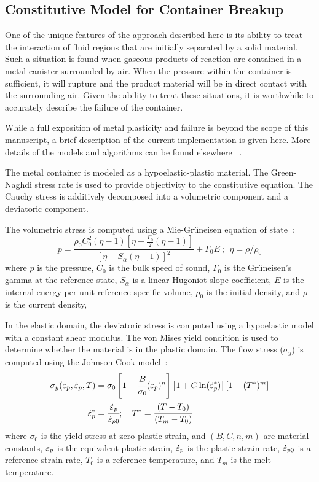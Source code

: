 \subsection{Constitutive Model for Container Breakup}\label{sec:cons_mod}

  One of the unique features of the approach described here is its ability to 
  treat the interaction of fluid regions that are initially separated by a 
  solid material.  Such a situation is found when gaseous products of 
  reaction are contained in a metal canister surrounded by air.  When the 
  pressure within the container is sufficient, it will rupture and the 
  product material will be in direct contact with the surrounding air.  Given 
  the ability to treat these situations, it is worthwhile to accurately 
  describe the failure of the container.

  While a full exposition of metal  
  plasticity and failure is beyond the scope of this manuscript, a brief 
  description of the current implementation is given here.  More details of
  the models and algorithms can be found elsewhere 
  ~\cite{Banerjee2005,Banerjee2005b,Banerjee2005d}.

  The metal container is modeled as a
  hypoelastic-plastic material.  The Green-Naghdi stress rate is used to 
  provide objectivity to the constitutive equation.  The Cauchy stress is 
  additively decomposed into a volumetric component and a deviatoric 
  component.  

  The volumetric stress is computed using a Mie-Gr{\"u}neisen equation of 
  state~\cite{Zocher2000}:
  \begin{equation} \label{eq:EOSMG}
   p = \frac{\rho_0 C_0^2 (\eta -1)
              \left[\eta - \frac{\Gamma_0}{2}(\eta-1)\right]}
             {\left[\eta - S_{\alpha}(\eta-1)\right]^2} + \Gamma_0 E~;~~
   \eta = \rho/\rho_0
  \end{equation}
  where $p$ is the pressure, $C_0$ is the bulk speed of sound,
  $\Gamma_0$ is the Gr{\"u}neisen's gamma at the reference state,
  $S_{\alpha}$ is a linear Hugoniot slope coefficient,
  $E$ is the internal energy per unit reference specific volume,
  $\rho_0$ is the initial density, and $\rho$ is the current density, 

 In the elastic domain, the deviatoric stress is computed using 
  a hypoelastic model with a constant shear modulus.  The von Mises yield 
  condition is used to determine whether the material is in the plastic 
  domain.  The flow stress ($\sigma_y$) is computed using the Johnson-Cook
  model~\cite{Johnson1983}: 
  \begin{align}
    \sigma_y(\varepsilon_p,\dot{\varepsilon}_{p},T) & =
    \sigma_0\left[1 + \cfrac{B}{\sigma_0} (\varepsilon_p)^n\right]
            \left[1 + C \ln(\dot{\varepsilon}_{p}^{*})\right]
            \left[1 - (T^*)^m\right] \\
    \dot{\varepsilon}_{p}^{*} & = \cfrac{\dot{\varepsilon}_{p}}{\dot{\varepsilon}_{p0}}; \quad
    T^* = \cfrac{(T-T_0)}{(T_m-T_0)}
  \end{align}
  where $\sigma_0$ is the yield stress at zero plastic strain, and
  $(B, C, n, m)$ are material constants, $\varepsilon_p$ is the equivalent plastic strain,
  $\dot{\varepsilon}_{p}$ is the plastic strain rate, $\dot{\varepsilon}_{p0}$ is a reference strain
  rate, $T_0$ is a reference temperature, and $T_m$ is the melt temperature.
  
